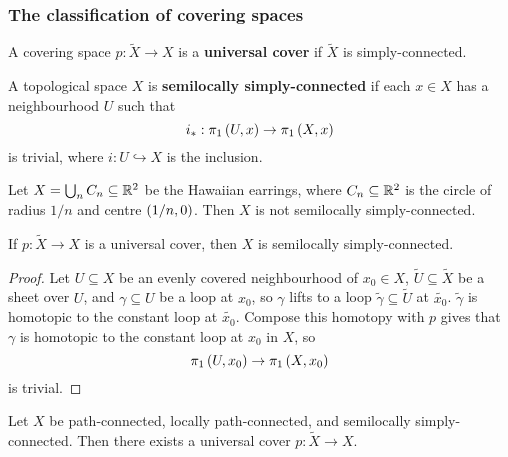 
\subsubsection{The classification of covering spaces}

\begin{definition*}
A covering space $ p : \widetilde{X} \to X $ is a \textbf{universal cover} if $ \widetilde{X} $ is simply-connected.
\end{definition*}

\begin{definition*}
A topological space $ X $ is \textbf{semilocally simply-connected} if each $ x \in X $ has a neighbourhood $ U $ such that
$$ i_* : \pi_1\left( U, x \right) \to \pi_1\left( X, x \right) $$
is trivial, where $ i : U \hookrightarrow X $ is the inclusion.
\end{definition*}

\begin{example*}
Let $ X = \bigcup_n C_n \subseteq \mathbb{R}^2 $ be the Hawaiian earrings, where $ C_n \subseteq \mathbb{R}^2 $ is the circle of radius $ 1 / n $ and centre $ \left( 1 / n, 0 \right) $. Then $ X $ is not semilocally simply-connected.
\end{example*}

\begin{proposition}
If $ p : \widetilde{X} \to X $ is a universal cover, then $ X $ is semilocally simply-connected.
\end{proposition}

\begin{proof}
Let $ U \subseteq X $ be an evenly covered neighbourhood of $ x_0 \in X $, $ \widetilde{U} \subseteq \widetilde{X} $ be a sheet over $ U $, and $ \gamma \subseteq U $ be a loop at $ x_0 $, so $ \gamma $ lifts to a loop $ \widetilde{\gamma} \subseteq \widetilde{U} $ at $ \widetilde{x_0} $. $ \widetilde{\gamma} $ is homotopic to the constant loop at $ \widetilde{x_0} $. Compose this homotopy with $ p $ gives that $ \gamma $ is homotopic to the constant loop at $ x_0 $ in $ X $, so
$$ \pi_1\left( U, x_0 \right) \to \pi_1\left( X, x_0 \right) $$
is trivial.
\end{proof}

\begin{theorem}
Let $ X $ be path-connected, locally path-connected, and semilocally simply-connected. Then there exists a universal cover $ p : \widetilde{X} \to X $.
\end{theorem}

